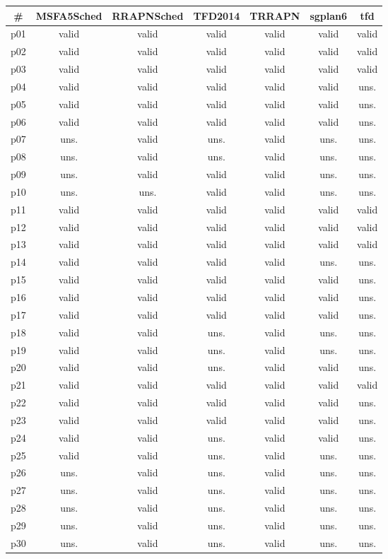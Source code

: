 \begin{tabular}{ccccccc}
\toprule
\textbf{\#} & \textbf{MSFA5Sched} & \textbf{RRAPNSched} & \textbf{TFD2014} & \textbf{TRRAPN} & \textbf{sgplan6} & \textbf{tfd}\\
\midrule
p01 & valid & valid & valid & valid & valid & valid\\
p02 & valid & valid & valid & valid & valid & valid\\
p03 & valid & valid & valid & valid & valid & valid\\
p04 & valid & valid & valid & valid & valid & uns.\\
p05 & valid & valid & valid & valid & valid & uns.\\
p06 & valid & valid & valid & valid & valid & uns.\\
p07 & uns. & valid & uns. & valid & uns. & uns.\\
p08 & uns. & valid & uns. & valid & uns. & uns.\\
p09 & uns. & valid & valid & valid & uns. & uns.\\
p10 & uns. & uns. & valid & valid & uns. & uns.\\
p11 & valid & valid & valid & valid & valid & valid\\
p12 & valid & valid & valid & valid & valid & valid\\
p13 & valid & valid & valid & valid & valid & valid\\
p14 & valid & valid & valid & valid & uns. & uns.\\
p15 & valid & valid & valid & valid & valid & uns.\\
p16 & valid & valid & valid & valid & valid & uns.\\
p17 & valid & valid & valid & valid & valid & uns.\\
p18 & valid & valid & uns. & valid & uns. & uns.\\
p19 & valid & valid & uns. & valid & uns. & uns.\\
p20 & valid & valid & uns. & valid & valid & uns.\\
p21 & valid & valid & valid & valid & valid & valid\\
p22 & valid & valid & valid & valid & valid & uns.\\
p23 & valid & valid & valid & valid & valid & uns.\\
p24 & valid & valid & uns. & valid & valid & uns.\\
p25 & valid & valid & uns. & valid & uns. & uns.\\
p26 & uns. & valid & uns. & valid & uns. & uns.\\
p27 & uns. & valid & uns. & valid & uns. & uns.\\
p28 & uns. & valid & uns. & valid & uns. & uns.\\
p29 & uns. & valid & uns. & valid & uns. & uns.\\
p30 & uns. & valid & uns. & valid & uns. & uns.\\
\bottomrule
\end{tabular}


